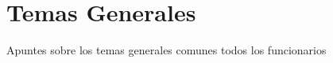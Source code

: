 \chapter{Temas Generales}
Apuntes sobre los temas generales comunes todos los funcionarios















